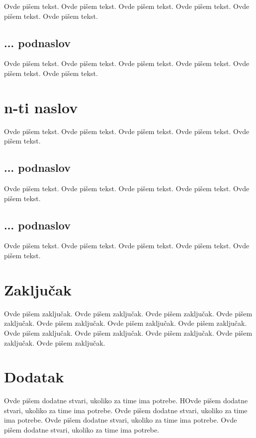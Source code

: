 \documentclass[a4paper]{article}
\begin{document}
Ovde pišem tekst. 
Ovde pišem tekst. 
Ovde pišem tekst. 
Ovde pišem tekst. 
Ovde pišem tekst. 
Ovde pišem tekst. 


\subsection{... podnaslov}
\label{subsec:podnaslovN}

Ovde pišem tekst. 
Ovde pišem tekst. 
Ovde pišem tekst. 
Ovde pišem tekst. 
Ovde pišem tekst. 
Ovde pišem tekst. 

\section{n-ti naslov}
\label{sec:naslovN}

Ovde pišem tekst. 
Ovde pišem tekst. 
Ovde pišem tekst. 
Ovde pišem tekst. 
Ovde pišem tekst. 

\subsection{... podnaslov}
\label{subsec:podnaslovK}

Ovde pišem tekst. 
Ovde pišem tekst. 
Ovde pišem tekst. 
Ovde pišem tekst. 
Ovde pišem tekst. 

\subsection{... podnaslov}
\label{subsec:podnaslovM}

Ovde pišem tekst. 
Ovde pišem tekst. 
Ovde pišem tekst. 
Ovde pišem tekst. 
Ovde pišem tekst. 


\section{Zaključak}
\label{sec:zakljucak}

Ovde pišem zaključak. 
Ovde pišem zaključak. 
Ovde pišem zaključak. 
Ovde pišem zaključak. 
Ovde pišem zaključak. 
Ovde pišem zaključak. 
Ovde pišem zaključak. 
Ovde pišem zaključak. 
Ovde pišem zaključak. 
Ovde pišem zaključak. 
Ovde pišem zaključak. 
Ovde pišem zaključak. 


\appendix
 


\appendix
\section{Dodatak}
Ovde pišem dodatne stvari, ukoliko za time ima potrebe.
HOvde pišem dodatne stvari, ukoliko za time ima potrebe.
Ovde pišem dodatne stvari, ukoliko za time ima potrebe.
Ovde pišem dodatne stvari, ukoliko za time ima potrebe.
Ovde pišem dodatne stvari, ukoliko za time ima potrebe.
\end{document}
